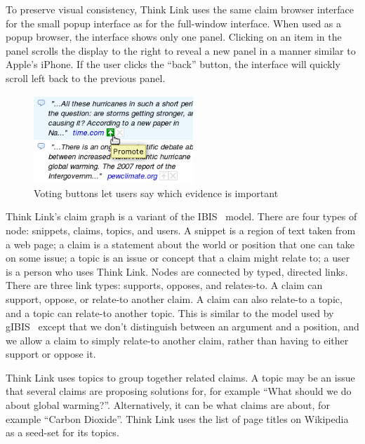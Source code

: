 \documentclass{chi2009}
\newcommand{\todo}[1]{}
\begin{document}
To preserve visual consistency, Think Link uses the same claim browser interface for the small popup interface as for the full-window interface. When used as a popup browser, the interface shows only one panel. Clicking on an item in the panel scrolls the display to the right to reveal a new panel in a manner similar to Apple's iPhone. If the user clicks the ``back'' button, the interface will quickly scroll left back to the previous panel.

\begin{figure}[tb]
	\begin{center}
	\includegraphics[width=6cm]{../screenshots/v2_vote.png}
	\caption{Voting buttons let users say which evidence is important}
	\label{voting}
	\end{center}
\end{figure}


Think Link's claim graph is a variant of the IBIS~\cite{Rittel1973} model. There are four types of node: snippets, claims, topics, and users. A snippet is a region of text taken from a web page; a claim is a statement about the world or position that one can take on some issue; a topic is an issue or concept that a claim might relate to; a user is a person who uses Think Link.  %
Nodes are connected by typed, directed links.  %
There are three link types: supports, opposes, and relates-to. 
A claim can support, oppose, or relate-to another claim.
A claim can also relate-to a topic, and a topic can relate-to another topic.  %
This is similar to the model used by gIBIS~\cite{Conklin1987} except that we don't distinguish between an argument and a position, and we allow a claim to simply relate-to another claim, rather than having to either support or oppose it.

Think Link uses topics to group together related claims. 
A topic may be an issue that several claims are proposing solutions for, for example ``What should we do about global warming?''. %
Alternatively, it can be what claims are about, for example ``Carbon Dioxide''.  %
Think Link uses the list of page titles on Wikipedia as a seed-set for its topics.
\end{document}
